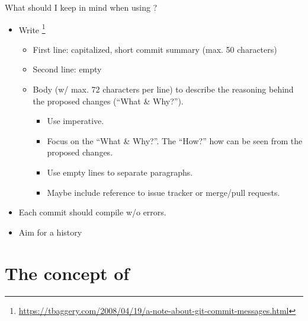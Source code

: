 \begin{frame}{What should I keep in mind when using ?}
\begin{itemize}
\item Write \footnote{\scriptsize{\url{https://tbaggery.com/2008/04/19/a-note-about-git-commit-messages.html}}}
\begin{itemize}
\item First line: capitalized, short commit summary (max. 50 characters)
\item Second line: empty
\item Body (w/ max. 72 characters per line) to describe the reasoning behind the proposed changes (``What \& Why?'').
\begin{itemize}
\item Use imperative.
\item Focus on the ``What \& Why?''. The ``How?'' how can be seen from the proposed changes.
\item Use empty lines to separate paragraphs.
\item Maybe include reference to issue tracker or merge/pull requests.
\end{itemize}
\end{itemize}
\item Each commit should compile w/o errors.
\item Aim for a  history
\end{itemize}
\end{frame}

\section{The concept of }


